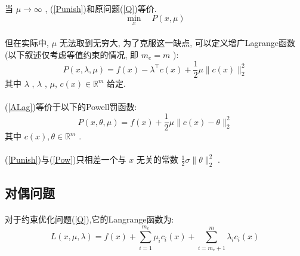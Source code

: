 \documentclass[a4paper, UTF8]{ctexart}				%
\numberwithin{equation}{section}				%
\begin{document}
			\paragraph{}
				\quad 当 $\mu \rightarrow \infty$ , (\ref{Punish})和原问题(\ref{Q})等价.
				\begin{equation}\label{Punish}
					\min_x \quad P(x,\mu)
				\end{equation}

			\paragraph{}
				\quad 但在实际中, $\mu$ 无法取到无穷大, 为了克服这一缺点, 可以定义增广Lagrange函数(以下叙述仅考虑等值约束的情况, 即 $m_e = m$ ):
				\begin{equation}\label{ALag}
						P(x, \lambda, \mu)
					=	f(x) - \lambda^\top c(x) + \frac{1}{2} \mu \lVert{c(x)}\rVert^2_2
				\end{equation}
				其中 $\lambda$ , $\lambda$ , $\mu$, $c(x) \in \mathbb{R}^{m}$ 给定.

			\paragraph{}
				\quad (\ref{ALag})等价于以下的Powell罚函数:
				\begin{equation}\label{Pow}
						P(x, \theta, \mu)
					=	f(x) + \frac{1}{2} \mu \lVert{c(x) - \theta}\rVert^2_2
				\end{equation}
				其中 $c(x) , \theta \in \mathbb{R}^{m}$ .

			\paragraph{}
				\quad (\ref{Punish})与(\ref{Pow})只相差一个与 $x$ 无关的常数 $\frac{1}{2} \sigma \lVert{\theta}\rVert^2_2$ .

		\subsection{对偶问题}
			\paragraph{}
				\quad 对于约束优化问题(\ref{Q}),它的Langrange函数为:
				\begin{equation}
						L(x, \mu, \lambda)
					=	f(x) + \sum^{m_e}_{i = 1} \mu_i c_i(x) + \sum^{m}_{i = m_e + 1} \lambda_i c_i(x)
				\end{equation}
\end{document}
